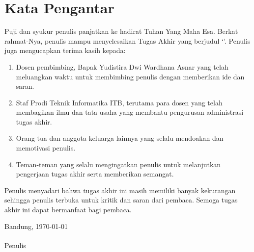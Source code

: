 \chapter*{Kata Pengantar}

Puji dan syukur penulis panjatkan ke hadirat Tuhan Yang Maha Esa. Berkat rahmat-Nya, penulis mampu menyelesaikan Tugas Akhir yang berjudul ‘\thetitle’. Penulis juga mengucapkan terima kasih kepada:
\begin{enumerate}
	\item Dosen pembimbing, Bapak Yudistira Dwi Wardhana Asnar yang telah meluangkan waktu untuk membimbing penulis dengan memberikan ide dan saran.
	\item Staf Prodi Teknik Informatika ITB, terutama para dosen yang telah membagikan ilmu dan tata usaha yang membantu pengurusan administrasi tugas akhir. 
	\item Orang tua dan anggota keluarga lainnya yang selalu mendoakan dan memotivasi penulis.
	\item Teman-teman yang selalu mengingatkan penulis untuk melanjutkan pengerjaan tugas akhir serta memberikan semangat.
\end{enumerate}

Penulis menyadari bahwa tugas akhir ini masih memiliki banyak kekurangan sehingga penulis terbuka untuk kritik dan saran dari pembaca. Semoga tugas akhir ini dapat bermanfaat bagi pembaca.

\null\hfill Bandung, \today\\
\vspace{15pt}\\
\null\hfill Penulis